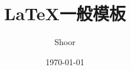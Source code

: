 \documentclass{article}
\title{\LaTeX 一般模板}
\author{Shoor}
\date{\today}
\begin{document}
\section{}
\end{document}
